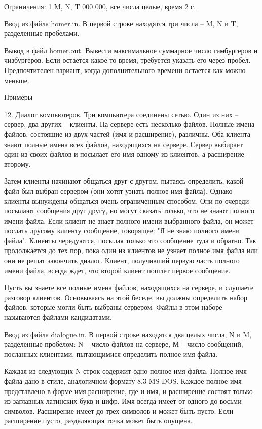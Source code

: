 \documentclass[]{article}
\begin{document}
Ограничения: 1 \leq M, N, T  000 000, все числа целые, время 2 с.

Ввод из файла homer.in. В первой строке находятся три числа – M, N и T, разделенные пробелами.

Вывод в файл homer.out. Вывести максимальное суммарное число гамбургеров и чизбургеров. Если остается какое-то время, требуется указать его через пробел. Предпочтителен вариант, когда дополнительного времени остается как можно меньше.

Примеры



12. Диалог компьютеров. Три компьютера соединены сетью. Один из них – сервер, два других – клиенты. На сервере есть несколько файлов. Полные имена файлов, состоящие из двух частей (имя и расширение), различны. Оба клиента знают полные имена всех файлов, находящихся на сервере. Сервер выбирает один из своих файлов и посылает его имя одному из клиентов, а расширение – второму.

Затем клиенты начинают общаться друг с другом, пытаясь определить, какой файл был выбран сервером (они хотят узнать полное имя файла). Однако клиенты вынуждены общаться очень ограниченным способом. Они по очереди посылают сообщения друг другу, но могут сказать только, что не знают полного имени файла. Если клиент не знает полного имени выбранного файла, он может послать другому клиенту сообщение, говорящее: "Я не знаю полного имени файла". Клиенты чередуются, посылая только это сообщение туда и обратно. Так продолжается до тех пор, пока один из клиентов не узнает полное имя файла или они не решат закончить диалог. Клиент, получивший первую часть полного имени файла, всегда ждет, что второй клиент пошлет первое сообщение.

Пусть вы знаете все полные имена файлов, находящихся на сервере, и слушаете разговор клиентов. Основываясь на этой беседе, вы должны определить набор файлов, которые могли быть выбраны сервером. Файлы в этом наборе называются файлами-кандидатами.

Ввод из файла dialogue.in. В первой строке находятся два целых числа, N и M, разделенные пробелом: N – число файлов на сервере, М – число сообщений, посланных клиентами, пытающимися определить полное имя файла.

Каждая из следующих N строк содержит одно полное имя файла. Полное имя файла дано в стиле, аналогичном формату 8.3 MS-DOS. Каждое полное имя представлено в форме имя.расширение, где и имя, и расширение состоят только из заглавных латинских букв и цифр. Имя всегда имеет от одного до восьми символов. Расширение имеет до трех символов и может быть пусто. Если расширение пусто, разделяющая точка может быть опущена.
\end{document}
